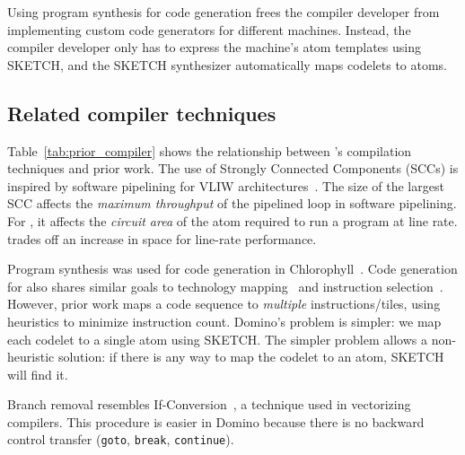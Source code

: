 Using program synthesis for code generation frees the compiler developer from implementing
custom code generators for different \absmachine machines.
Instead, the
compiler developer only has to express the \absmachine machine's
atom templates using SKETCH, and the SKETCH synthesizer automatically maps
codelets to atoms.


\subsection{Related compiler techniques}
\label{ss:related_compiler}
Table~\ref{tab:prior_compiler} shows the relationship between \pktlanguage's
compilation techniques and prior work. The use of Strongly Connected Components
(SCCs) is inspired by software pipelining for VLIW
architectures~\cite{software_pipelining}. The size of the largest SCC affects
the {\em maximum throughput} of the pipelined loop in software pipelining. For
\pktlanguage, it affects the {\em circuit area} of the atom required to run a
program at line rate. \pktlanguage trades off an increase in space for
line-rate performance.

Program synthesis was used for code generation in
Chlorophyll~\cite{chlorophyll}.  Code generation for \pktlanguage also shares
similar goals to technology mapping~\cite{micheli} and
instruction selection~\cite{dragonbook}.  However, prior work maps a code sequence
to \textit{multiple} instructions/tiles, using heuristics to minimize
instruction count. Domino's problem is simpler: we map each codelet to a single
atom using SKETCH.  The simpler problem allows a non-heuristic solution: if
there is any way to map the codelet to an atom, SKETCH will find it.

Branch removal resembles If-Conversion~\cite{if_conversion}, a
technique used in vectorizing compilers. This procedure is easier in Domino
because there is no backward control transfer ({\tt goto}, {\tt break},
{\tt continue}).

